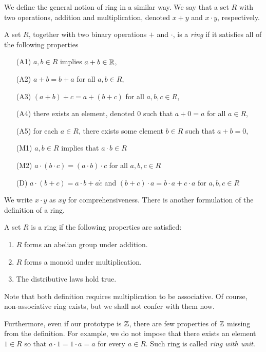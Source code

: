 \documentclass[main.tex]{subfiles}
\begin{document}
			We define the general notion of ring in a similar way. We say that a set $R$ with two operations, addition and multiplication, denoted $x + y$ and $x \cdot y$, respectively.
			\begin{definition}
				A set $R$, together with two binary operations $+$ and $\cdot$, is a \textit{ring} if it satisfies all of the following properties 
				\begin{itemize}
					\item [(A1)] $a, b \in R$ implies $a + b \in \mathbb R$,
					\item [(A2)] $a + b = b + a$ for all $a, b\in R$,
					\item [(A3)] $(a + b) + c = a + (b + c)$ for all $a, b, c \in  R$,
					\item [(A4)] there exists an element, denoted $0$ such that $a + 0 = a$ for all $a \in R$,
					\item [(A5)] for each $a \in R$, there exists some element $b \in R$ such that $a + b = 0$,
					\item [(M1)] $a, b \in R$ implies that $a \cdot b \in R$
					\item [(M2)] $a \cdot (b \cdot c) = (a \cdot b) \cdot c$ for all $a, b, c\in R$
					\item [(D)] $a\cdot(b + c) = a\cdot b + a\dot c$ and $(b + c)\cdot a = b\cdot a + c \cdot a$ for $a, b, c\in R$
				\end{itemize}
			\end{definition}
			We write $x \cdot y$ as $xy$ for comprehensiveness. There is another formulation of the definition of a ring.
			\begin{definition}
				A set $R$ is a ring if the following properties are satisfied:
				\begin{enumerate}
					\item $R$ forms an abelian group under addition.
					\item $R$ forms a monoid under multiplication.
					\item The distributive laws hold true.
				\end{enumerate}
			\end{definition}
			Note that both definition requires multiplication to be associative. Of course, non-associative ring exists, but we shall not confer with them now.
			
			Furthermore, even if our prototype is $\mathbb Z$, there are few properties of $\mathbb Z$ missing from the definition. For example, we do not impose that there exists an element $1 \in R$ so that $a \cdot 1 = 1 \cdot a = a$ for every $a \in R$. Such ring is called \textit{ring with unit}.
			
\end{document}
